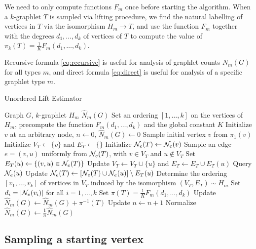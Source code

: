 	We need to only compute functions $F_m$ once before starting the algorithm.
	When a $k$-graphlet $T$ is sampled via lifting procedure, we find the natural labelling of vertices in $T$ via the isomorphism $H_m \rightarrow T$, and use the function $F_m$ together with the degrees $d_1,\ldots,d_k$ of vertices of $T$ to compute the value of 
	$\pi_k(T) = \frac{1}{K} F_{m}(d_1,\ldots,d_k)$.
	
	Recursive formula \eqref{eq:recursive} is useful for analysis of graphlet counts $N_m(G)$ for all types $m$, and direct formula \eqref{eq:direct} is useful for analysis of a specific graphlet type $m$.
	
\begin{algorithm}[h]
\label{alg:OLE}
\caption{Unordered Lift Estimator}
\begin{algorithmic}
    \INPUT Graph $G$, $k$-graphlet $H_m$
    \OUTPUT $\hat N_m(G)$
    \STATE Set an ordering $[1,\ldots, k]$ on the vertices of $H_m$, precompute the function $F_m(d_1,\ldots, d_k)$ and the global constant $K$
    \STATE Initialize $v$ at an arbitrary node, $n \gets 0$, $\hat N_m(G) \gets 0$
        \STATE Sample initial vertex $v$ from $\pi_1(v)$
        \STATE Initialize $V_T \gets \{v\}$ and $E_T \gets \{\}$
        \STATE Initialize $\mathcal{N}_e(T)\gets \mathcal{N}_e(v)$
            \STATE Sample an edge $e=(v,u)$ uniformly from $\mathcal{N}_e(T)$, with $v\in V_T$ and $u\notin V_T$
            \STATE Set $E_T(u) \gets \{(v,u)\in \mathcal{N}_e(T)\}$
            \STATE Update $V_T\gets V_T\cup\{u\}$ and $E_T \gets E_T \cup E_T(u)$
            \STATE Query $\mathcal{N}_e(u)$
            \STATE Update $\mathcal{N}_e(T) \gets [\mathcal{N}_e(T)\cup\mathcal{N}_e(u)]\setminus E_T(u)$
        \ENDWHILE
            \STATE Determine the ordering $[v_1,\ldots,v_k]$ of vertices in $V_T$ induced by the isomorphism $(V_T, E_T)\sim H_m$
            \STATE Set $d_i = |\mathcal{N}_e(v_i)|$ for all $i=1,\ldots, k$
            \STATE Set $\pi(T) = \frac{1}{K}F_m(d_1,\ldots,d_k)$
            \STATE Update $\hat N_m(G) \gets \hat N_m(G) + \pi^{-1}(T)$
        \ENDIF
       \STATE Update $n \gets n + 1$
    \ENDWHILE
    \STATE Normalize $\hat N_m(G) \gets \frac{1}{n}\hat N_m(G)$
\end{algorithmic}
\end{algorithm}

	\subsection{Sampling a starting vertex}
	
